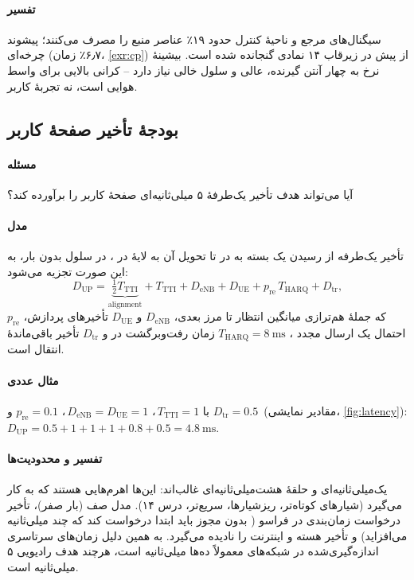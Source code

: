 \documentclass[11pt,a4paper]{article}
\begin{document}
\paragraph{تفسیر} سیگنال‌های مرجع و ناحیهٔ کنترل حدود ۱۹٪ عناصر منبع را مصرف می‌کنند؛ پیشوند چرخه‌ای
(۶٫۷٪ زمان، \cref{exr:cp}) از پیش در زیرقاب ۱۴ نمادی گنجانده شده است. بیشینهٔ نرخ به چهار آنتن
گیرنده،  عالی و سلول خالی نیاز دارد -- کرانی بالایی برای واسط هوایی است، نه تجربهٔ کاربر.

\subsection{بودجهٔ تأخیر صفحهٔ کاربر}\label{sec:latency}
\paragraph{مسئله} آیا  می‌تواند هدف تأخیر یک‌طرفهٔ ۵ میلی‌ثانیه‌ای صفحهٔ کاربر را برآورده کند؟
\paragraph{مدل} تأخیر یک‌طرفه از رسیدن یک بسته به  در  تا تحویل آن به لایهٔ 
در ، در سلول بدون بار، به این صورت تجزیه می‌شود:
\begin{equation}\label{eq:latency}
  D_{\mathrm{UP}} = \underbrace{\tfrac{1}{2}T_{\mathrm{TTI}}}_{\text{alignment}}
  + T_{\mathrm{TTI}} + D_{\mathrm{eNB}} + D_{\mathrm{UE}} + p_{\mathrm{re}}\,T_{\mathrm{HARQ}}
  + D_{\mathrm{tr}},
\end{equation}
که جملهٔ هم‌ترازی میانگین انتظار تا مرز  بعدی، $D_{\mathrm{eNB}}$ و $D_{\mathrm{UE}}$ تأخیرهای
پردازش، $p_{\mathrm{re}}$ احتمال یک ارسال مجدد ، $T_{\mathrm{HARQ}} = \qty{8}{\milli\second}$
زمان رفت‌وبرگشت  در  و $D_{\mathrm{tr}}$ تأخیر باقی‌ماندهٔ انتقال است.
\paragraph{مثال عددی} با $T_{\mathrm{TTI}} = 1$\,، $D_{\mathrm{eNB}} = D_{\mathrm{UE}} = 1$\,،
$p_{\mathrm{re}} = 0.1$ و $D_{\mathrm{tr}} = 0.5$\, (مقادیر نمایشی، \cref{fig:latency}):
$D_{\mathrm{UP}} = 0.5 + 1 + 1 + 1 + 0.8 + 0.5 = \qty{4.8}{\milli\second}$.
\paragraph{تفسیر و محدودیت‌ها}  یک‌میلی‌ثانیه‌ای و حلقهٔ  هشت‌میلی‌ثانیه‌ای غالب‌اند:
این‌ها اهرم‌هایی هستند که  به کار می‌گیرد (شیارهای کوتاه‌تر، ریزشیارها،  سریع‌تر، درس
۱۴). مدل صف (بار صفر)، تأخیر درخواست زمان‌بندی در فراسو ( بدون مجوز باید ابتدا درخواست کند که
چند میلی‌ثانیه می‌افزاید) و تأخیر هسته و اینترنت را نادیده می‌گیرد. به همین دلیل زمان‌های 
سرتاسری اندازه‌گیری‌شده در شبکه‌های  معمولاً ده‌ها میلی‌ثانیه است، هرچند هدف رادیویی ۵
میلی‌ثانیه است.
\end{document}
